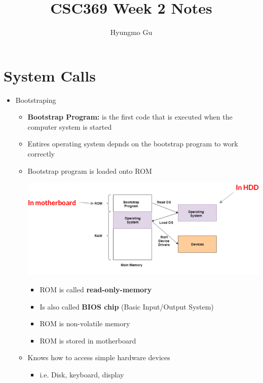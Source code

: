\documentclass[12pt]{article}
\begin{document}
\title{CSC369 Week 2 Notes}
\author{Hyungmo Gu}
\maketitle

\section{System Calls}

\bigskip

\begin{itemize}
    \item Bootstraping
    \begin{itemize}
        \item \textbf{Bootstrap Program:} is the first code that is executed when
        the computer system is started
        \item Entires operating system depnds on the bootstrap program to work
        correctly

        \item Bootstrap program is loaded onto ROM

        \begin{center}
        \includegraphics[width=\linewidth]{images/week_2_notes_1_1.png}
        \end{center}

        \begin{itemize}
            \item ROM is called \textbf{read-only-memory}
            \item Is also called \textbf{BIOS chip} (Basic Input/Output System)
            \item ROM is non-volatile memory
            \item ROM is stored in motherboard
        \end{itemize}

        \item Knows how to access simple hardware devices
        \begin{itemize}
            \item i.e. Disk, keyboard, display
        \end{itemize}


\end{itemize}
\end{itemize}
\end{document}
